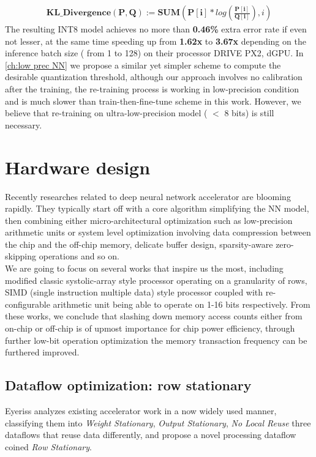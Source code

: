 \begin{equation}
    \begin{aligned}\label{eq:kl_div}
    \textbf{KL\_Divergence} ( \boldsymbol{P} , \boldsymbol{Q} ) := \textbf{SUM} ( \boldsymbol{P[i]} * log ( \frac{ \boldsymbol{P[i]}}{\boldsymbol{Q[i]}} ) , i)
    \end{aligned}
\end{equation}
The resulting INT8 model achieves no more than \textbf{0.46\%} extra error rate if even not lesser, at the same time speeding up from \textbf{1.62x} to \textbf{3.67x} depending on the inference batch size ( from 1 to 128) on their processor DRIVE PX2, dGPU.
In \autoref{ch:low prec NN} we propose a similar yet simpler scheme to compute the desirable quantization threshold, although our approach involves no calibration after the training, the re-training process is working in low-precision condition and is much slower than train-then-fine-tune scheme in this work. However, we believe that re-training on ultra-low-precision model ( $<$ 8 bits) is still necessary.

\section{Hardware design}
Recently researches related to deep neural network accelerator are blooming rapidly. They typically start off with a core algorithm simplifying the NN model, then combining either micro-architectural optimization such as low-precision arithmetic units or system level optimization involving data compression between the chip and the off-chip memory, delicate buffer design, sparsity-aware zero-skipping operations and so on. \\
We are going to focus on several works that inspire us the most, including modified classic systolic-array style processor operating on a granularity of rows, SIMD (single instruction multiple data) style processor coupled with re-configurable arithmetic unit being able to operate on 1-16 bits respectively.
From these works, we conclude that slashing down memory access counts either from on-chip or off-chip is of upmost importance for chip power efficiency, through further low-bit operation optimization the memory transaction frequency can be furthered improved. 
\subsection{Dataflow optimization: row stationary}
Eyeriss\cite{Eyeriss} analyzes existing accelerator work in a now widely used manner, classifying them into \textit{Weight Stationary}, \textit{Output Stationary}, \textit{No Local Reuse} three dataflows that reuse data differently, and propose a novel processing dataflow coined \textit{Row Stationary}. 
